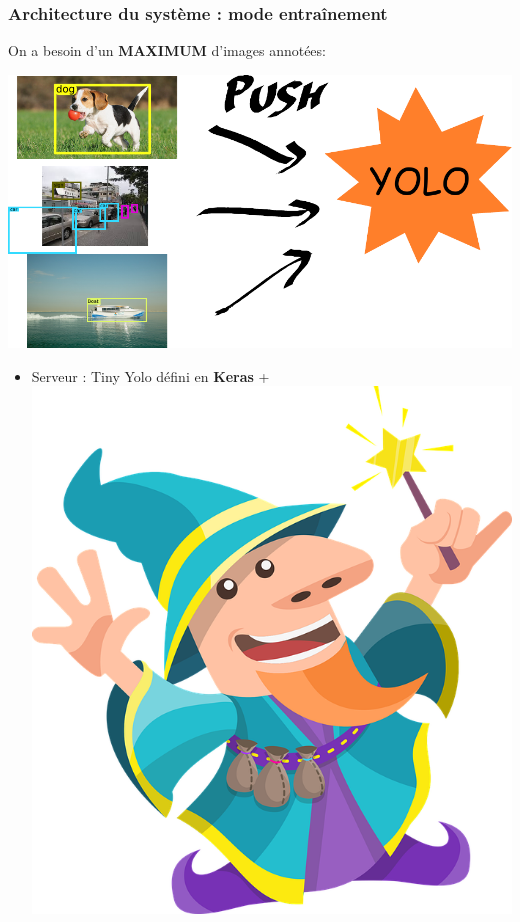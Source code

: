\documentclass[11pt]{beamer}
\begin{document}
\begin{frame}
\frametitle{ Architecture du système : mode entraînement}
On a besoin d'un \textbf{MAXIMUM} d'images annotées:
\vspace{-2mm}
\begin{center}
\includegraphics[keepaspectratio=true,height=0.25\textheight]{images/archi_train.pdf}
\end{center}
\pause
\vspace{-3mm}
\begin{itemize}
\item Serveur : Tiny Yolo défini en \textbf{Keras} + \includegraphics[keepaspectratio=true,height=2\baselineskip]{images/wizard.png}

\end{itemize}
\end{frame}
\end{document}
